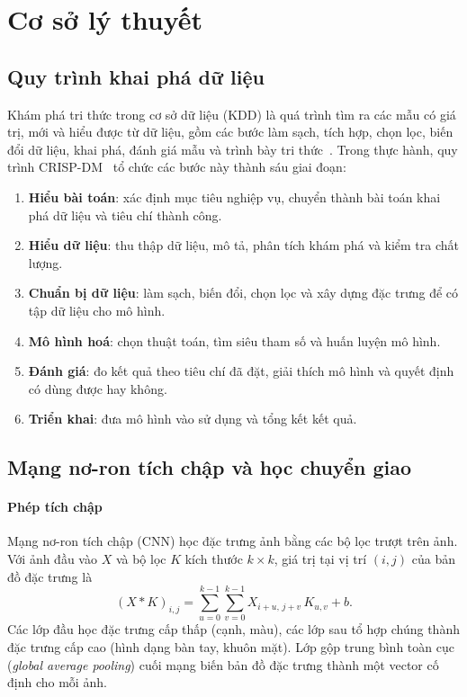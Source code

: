 \section{Cơ sở lý thuyết}
\label{sec:theory}

\subsection{Quy trình khai phá dữ liệu}
\label{subsec:crispdm}

Khám phá tri thức trong cơ sở dữ liệu (KDD) là quá trình tìm ra các mẫu có giá trị, mới và hiểu được từ dữ liệu, gồm các bước làm sạch, tích hợp, chọn lọc, biến đổi dữ liệu, khai phá, đánh giá mẫu và trình bày tri thức~\cite{han2022}. Trong thực hành, quy trình CRISP-DM~\cite{wirth2000crispdm} tổ chức các bước này thành sáu giai đoạn:
\begin{enumerate}
  \item \textbf{Hiểu bài toán}: xác định mục tiêu nghiệp vụ, chuyển thành bài toán khai phá dữ liệu và tiêu chí thành công.
  \item \textbf{Hiểu dữ liệu}: thu thập dữ liệu, mô tả, phân tích khám phá và kiểm tra chất lượng.
  \item \textbf{Chuẩn bị dữ liệu}: làm sạch, biến đổi, chọn lọc và xây dựng đặc trưng để có tập dữ liệu cho mô hình.
  \item \textbf{Mô hình hoá}: chọn thuật toán, tìm siêu tham số và huấn luyện mô hình.
  \item \textbf{Đánh giá}: đo kết quả theo tiêu chí đã đặt, giải thích mô hình và quyết định có dùng được hay không.
  \item \textbf{Triển khai}: đưa mô hình vào sử dụng và tổng kết kết quả.
\end{enumerate}


\subsection{Mạng nơ-ron tích chập và học chuyển giao}
\label{subsec:cnn}

\paragraph*{Phép tích chập} Mạng nơ-ron tích chập (CNN) học đặc trưng ảnh bằng các bộ lọc trượt trên ảnh. Với ảnh đầu vào $X$ và bộ lọc $K$ kích thước $k\times k$, giá trị tại vị trí $(i,j)$ của bản đồ đặc trưng là
\begin{equation}
  (X * K)_{i,j} = \sum_{u=0}^{k-1}\sum_{v=0}^{k-1} X_{i+u,\,j+v}\,K_{u,v} + b.
\end{equation}
Các lớp đầu học đặc trưng cấp thấp (cạnh, màu), các lớp sau tổ hợp chúng thành đặc trưng cấp cao (hình dạng bàn tay, khuôn mặt). Lớp gộp trung bình toàn cục (\textit{global average pooling}) cuối mạng biến bản đồ đặc trưng thành một vector cố định cho mỗi ảnh.

